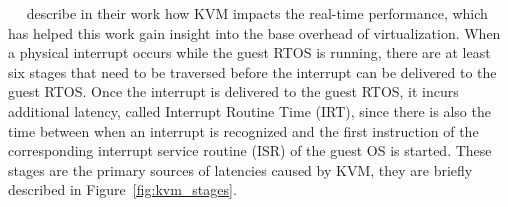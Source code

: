 \documentclass[MMR,Master,english]{twbook}
\begin{document}
\bigskip \noindent \citeauthor{maPerformanceTuningKVMbased2013}~\cite{maPerformanceTuningKVMbased2013}~\cite{junzhangPerformanceAnalysisKVMBased2010} describe in their work how KVM impacts the real-time performance, which has helped this work gain insight into the base overhead of virtualization. When a physical interrupt occurs while the guest RTOS is running, there are at least six stages that need to be traversed before the interrupt can be delivered to the guest RTOS. Once the interrupt is delivered to the guest RTOS, it incurs additional latency, called Interrupt Routine Time (IRT), since there is also the time between when an interrupt is recognized and the first instruction of the corresponding interrupt service routine (ISR) of the guest OS is started. These stages are the primary sources of latencies caused by KVM, they are briefly described in Figure~\ref{fig:kvm_stages}.
\vspace{2em}
\end{document}
